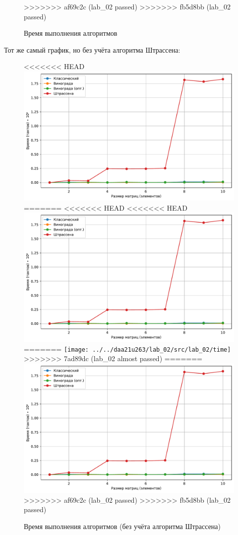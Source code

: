 \begin{figure}
>>>>>>> af69c2c (lab_02 passed)
>>>>>>> fb5d8bb (lab_02 passed)
	\caption{Время выполнения алгоритмов}
	\label{fig:timefull}
\end{figure}

Тот же самый график, но без учёта алгоритма Штрассена:

\begin{figure}
	\centering
<<<<<<< HEAD
	\includegraphics[width=0.9\linewidth]{../src/lab_02/time}
=======
<<<<<<< HEAD
<<<<<<< HEAD
	\includegraphics[width=0.9\linewidth]{../src/lab_02/time}
=======
	\texttt{[image: ../../daa21u263/lab\_02/src/lab\_02/time]}
>>>>>>> 7ad89dc (lab_02 almost passed)
=======
	\includegraphics[width=0.9\linewidth]{../src/lab_02/time}
>>>>>>> af69c2c (lab_02 passed)
>>>>>>> fb5d8bb (lab_02 passed)
	\caption{Время выполнения алгоритмов (без учёта алгоритма Штрассена)}
	\label{fig:time}
\end{figure}

